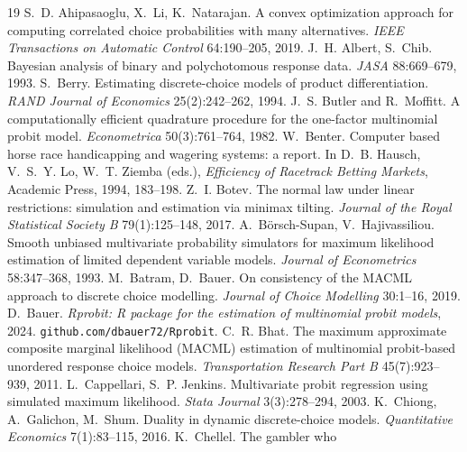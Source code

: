 \documentclass[11pt]{article}
\begin{document}
\begin{thebibliography}{19}\small
{} S.~D. Ahipasaoglu, X.~Li, K.~Natarajan. A
convex optimization approach for computing correlated choice
probabilities with many alternatives. \emph{IEEE Transactions on
Automatic Control} 64:190--205, 2019.
 J.~H. Albert, S.~Chib.
Bayesian analysis of binary and polychotomous response data.
\emph{JASA} 88:669--679, 1993.
 S.~Berry.
Estimating discrete-choice models of product differentiation.
\emph{RAND Journal of Economics} 25(2):242--262, 1994.
 J.~S. Butler and R.~Moffitt.
A computationally efficient quadrature procedure for the one-factor
multinomial probit model. \emph{Econometrica} 50(3):761--764, 1982.
 W.~Benter. Computer based horse
race handicapping and wagering systems: a report. In D.~B. Hausch,
V.~S.~Y. Lo, W.~T. Ziemba (eds.), \emph{Efficiency of Racetrack
Betting Markets}, Academic Press, 1994, 183--198.
 Z.~I. Botev.
The normal law under linear restrictions: simulation and estimation via minimax
tilting. \emph{Journal of the Royal Statistical Society B} 79(1):125--148, 2017.
A.~B\"orsch-Supan, V.~Hajivassiliou. Smooth unbiased multivariate probability
simulators for maximum likelihood estimation of limited dependent variable
models. \emph{Journal of Econometrics} 58:347--368, 1993.
 M.~Batram, D.~Bauer.
On consistency of the MACML approach to discrete choice modelling.
\emph{Journal of Choice Modelling} 30:1--16, 2019.
 D.~Bauer.
\emph{Rprobit: R package for the estimation of multinomial probit models},
2024. \texttt{github.com/dbauer72/Rprobit}.
 C.~R. Bhat.
The maximum approximate composite marginal likelihood (MACML) estimation of
multinomial probit-based unordered response choice models.
\emph{Transportation Research Part B} 45(7):923--939, 2011.
 L.~Cappellari,
S.~P. Jenkins. Multivariate probit regression using simulated maximum
likelihood. \emph{Stata Journal} 3(3):278--294, 2003.
 K.~Chiong, A.~Galichon, M.~Shum.
Duality in dynamic discrete-choice models.
\emph{Quantitative Economics} 7(1):83--115, 2016.
 K.~Chellel. The gambler who

\end{thebibliography}
\end{document}
